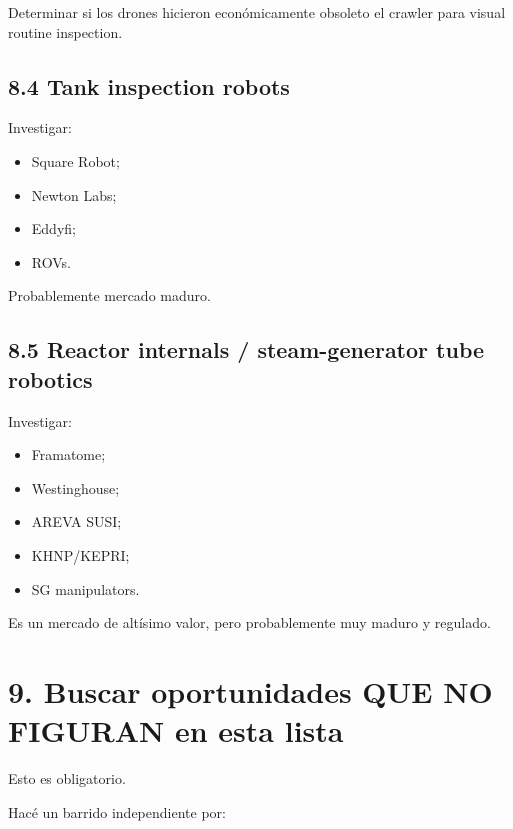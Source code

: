 \documentclass[11pt,a4paper]{article}
\begin{document}
Determinar si los drones hicieron económicamente obsoleto el crawler para visual routine inspection.


\subsection*{8.4 Tank inspection robots}
Investigar:

\begin{itemize}
\item Square Robot;
\item Newton Labs;
\item Eddyfi;
\item ROVs.
\end{itemize}

Probablemente mercado maduro.


\subsection*{8.5 Reactor internals / steam-generator tube robotics}
Investigar:

\begin{itemize}
\item Framatome;
\item Westinghouse;
\item AREVA SUSI;
\item KHNP/KEPRI;
\item SG manipulators.
\end{itemize}

Es un mercado de altísimo valor, pero probablemente muy maduro y regulado.


\section*{9. Buscar oportunidades QUE NO FIGURAN en esta lista}
Esto es obligatorio.

Hacé un barrido independiente por:
\end{document}
